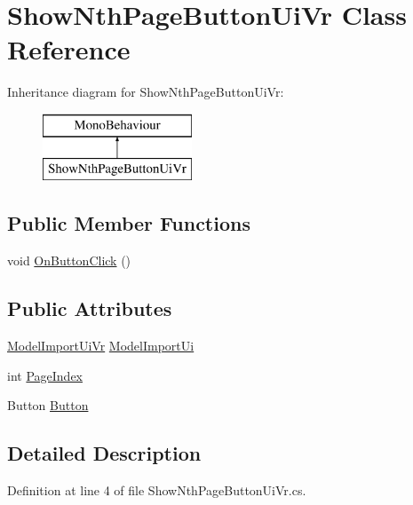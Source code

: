 \hypertarget{class_show_nth_page_button_ui_vr}{}\section{Show\+Nth\+Page\+Button\+Ui\+Vr Class Reference}
\label{class_show_nth_page_button_ui_vr}
Inheritance diagram for Show\+Nth\+Page\+Button\+Ui\+Vr\+:\begin{figure}[H]
\begin{center}
\leavevmode
\includegraphics[height=2.000000cm]{class_show_nth_page_button_ui_vr}
\end{center}
\end{figure}
\subsection*{Public Member Functions}
\begin{DoxyCompactItemize}
\item 
void \mbox{\hyperlink{class_show_nth_page_button_ui_vr_abc78e23efec1c960ebe9b2d6e3c5ccfc}{On\+Button\+Click}} ()
\end{DoxyCompactItemize}
\subsection*{Public Attributes}
\begin{DoxyCompactItemize}
\item 
\mbox{\hyperlink{class_model_import_ui_vr}{Model\+Import\+Ui\+Vr}} \mbox{\hyperlink{class_show_nth_page_button_ui_vr_a0acbdf8d5d99979fd48ed1909aa5c36f}{Model\+Import\+Ui}}
\item 
int \mbox{\hyperlink{class_show_nth_page_button_ui_vr_ad2b4444240bad6736dbeef14943771c2}{Page\+Index}}
\item 
Button \mbox{\hyperlink{class_show_nth_page_button_ui_vr_ae324d65614f056d2ffa67a8315dc7d15}{Button}}
\end{DoxyCompactItemize}


\subsection{Detailed Description}


Definition at line 4 of file Show\+Nth\+Page\+Button\+Ui\+Vr.\+cs.



